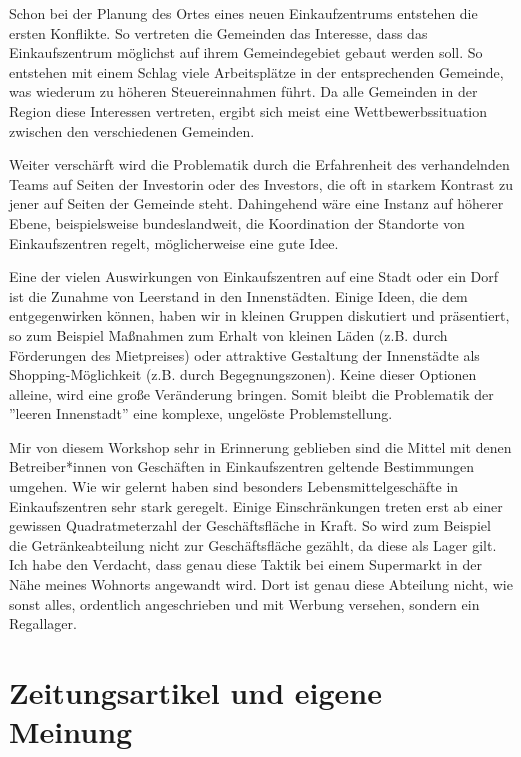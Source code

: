 \documentclass[]{article}
\begin{document}
Schon bei der Planung des Ortes eines neuen Einkaufzentrums entstehen die ersten Konflikte. So vertreten die Gemeinden das Interesse, dass das Einkaufszentrum möglichst auf ihrem Gemeindegebiet gebaut werden soll. So entstehen mit einem Schlag viele Arbeitsplätze in der entsprechenden Gemeinde, was wiederum zu höheren Steuereinnahmen führt. Da alle Gemeinden in der Region diese Interessen vertreten, ergibt sich meist eine Wettbewerbssituation zwischen den verschiedenen Gemeinden.

Weiter verschärft wird die Problematik durch die Erfahrenheit des verhandelnden Teams auf Seiten der Investorin oder des Investors, die oft in starkem Kontrast zu jener auf Seiten der Gemeinde steht. Dahingehend wäre eine Instanz auf höherer Ebene, beispielsweise bundeslandweit, die Koordination der Standorte von Einkaufszentren regelt, möglicherweise eine gute Idee.

Eine der vielen Auswirkungen von Einkaufszentren auf eine Stadt oder ein Dorf ist die Zunahme von Leerstand in den Innenstädten. Einige Ideen, die dem entgegenwirken können, haben wir in kleinen Gruppen diskutiert und präsentiert, so zum Beispiel Maßnahmen zum Erhalt von kleinen Läden (z.B. durch Förderungen des Mietpreises) oder attraktive Gestaltung der Innenstädte als Shopping-Möglichkeit (z.B. durch Begegnungszonen). Keine dieser Optionen alleine, wird eine große Veränderung bringen. Somit bleibt die Problematik der ''leeren Innenstadt'' eine komplexe, ungelöste Problemstellung.

Mir von diesem Workshop sehr in Erinnerung geblieben sind die Mittel mit denen Betreiber*innen von Geschäften in Einkaufszentren geltende Bestimmungen umgehen. Wie wir gelernt haben sind besonders Lebensmittelgeschäfte in Einkaufszentren sehr stark geregelt. Einige Einschränkungen treten erst ab einer gewissen Quadratmeterzahl der Geschäftsfläche in Kraft. So wird zum Beispiel die Getränkeabteilung nicht zur Geschäftsfläche gezählt, da diese als Lager gilt. Ich habe den Verdacht, dass genau diese Taktik bei einem Supermarkt in der Nähe meines Wohnorts angewandt wird. Dort ist genau diese Abteilung nicht, wie sonst alles, ordentlich angeschrieben und mit Werbung versehen, sondern ein Regallager.

\section{Zeitungsartikel und eigene Meinung}
\end{document}
